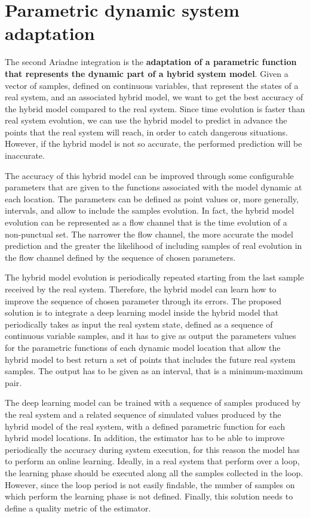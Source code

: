 \section{Parametric dynamic system adaptation}

The second Ariadne integration is the \textbf{adaptation of a parametric function that represents the dynamic part of a hybrid system model}. Given a vector of samples, defined on continuous variables, that represent the states of a real system, and an associated hybrid model, we want to get the best accuracy of the hybrid model compared to the real system. Since time evolution is faster than real system evolution, we can use the hybrid model to predict in advance the points that the real system will reach, in order to catch dangerous situations. However, if the hybrid model is not so accurate, the performed prediction will be inaccurate. 

The accuracy of this hybrid model can be improved through some configurable parameters that are given to the functions associated with the model dynamic at each location. The parameters can be defined as point values or, more generally, intervals, and allow to include the samples evolution. In fact, the hybrid model evolution can be represented as a flow channel that is the time evolution of a non-punctual set. The narrower the flow channel, the more accurate the model prediction and the greater the likelihood of including samples of real evolution in the flow channel defined by the sequence of chosen parameters.

The hybrid model evolution is periodically repeated starting from the last sample received by the real system. Therefore, the hybrid model can learn how to improve the sequence of chosen parameter through its errors. The proposed solution is to integrate a deep learning model inside the hybrid model that periodically takes as input the real system state, defined as a sequence of continuous variable samples, and it has to give as output the parameters values for the parametric functions of each dynamic model location that allow the hybrid model to best return a set of points that includes the future real system samples. The output has to be given as an interval, that is a minimum-maximum pair. 

The deep learning model can be trained with a sequence of samples produced by the real system and a related sequence of simulated values produced by the hybrid model of the real system, with a defined parametric function for each hybrid model locations. In addition, the estimator has to be able to improve periodically the accuracy during system execution, for this reason the model has to perform an online learning. Ideally, in a real system that perform over a loop, the learning phase should be executed along all the samples collected in the loop. However, since the loop period is not easily findable, the number of samples on which perform the learning phase is not defined. Finally, this solution needs to define a quality metric of the estimator.

